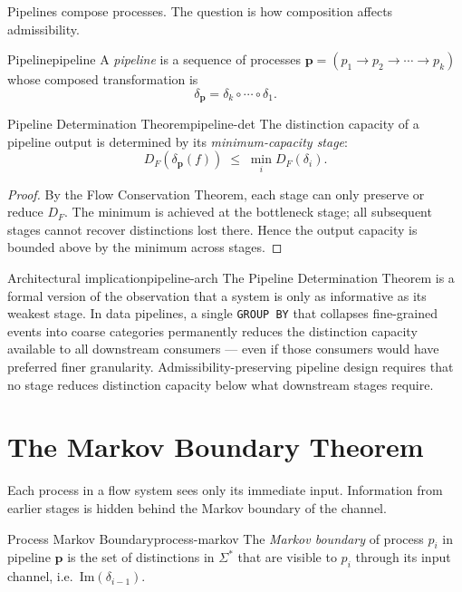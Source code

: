 \documentclass[12pt,twoside,openright]{book}
\newcommand{\csicon} {\marginpar{\tiny\color{DistBlue}\faCode}}
\begin{document}
Pipelines compose processes. The question is how
composition affects admissibility.

\begin{definition}{Pipeline}{pipeline}
  A \emph{pipeline} is a sequence of processes
  $\mathbf{p} = (p_1 \to p_2 \to \cdots \to p_k)$
  whose composed transformation is
  \[
    \delta_\mathbf{p} = \delta_k \circ \cdots \circ \delta_1.
  \]
\end{definition}

\begin{theorem}{Pipeline Determination Theorem}{pipeline-det}
  The distinction capacity of a pipeline output is
  determined by its \emph{minimum-capacity stage}:
  \[
    D_F(\delta_\mathbf{p}(f))
    \;\le\;
    \min_{i} D_F(\delta_i).
  \]
\end{theorem}

\begin{proof}
  By the Flow Conservation Theorem, each stage can only
  preserve or reduce $D_F$. The minimum is achieved at
  the bottleneck stage; all subsequent stages cannot
  recover distinctions lost there. Hence the output
  capacity is bounded above by the minimum across stages.
\end{proof}

\begin{remark}{Architectural implication}{pipeline-arch}
  \csicon
  The Pipeline Determination Theorem is a formal version
  of the observation that a system is only as informative
  as its weakest stage. In data pipelines, a single
  \texttt{GROUP BY} that collapses fine-grained events
  into coarse categories permanently reduces the
  distinction capacity available to all downstream
  consumers — even if those consumers would have
  preferred finer granularity. Admissibility-preserving
  pipeline design requires that no stage reduces
  distinction capacity below what downstream stages
  require.
\end{remark}

\section{The Markov Boundary Theorem}

Each process in a flow system sees only its immediate
input. Information from earlier stages is hidden behind
the Markov boundary of the channel.

\begin{definition}{Process Markov Boundary}{process-markov}
  The \emph{Markov boundary} of process $p_i$ in
  pipeline $\mathbf{p}$ is the set of distinctions
  in $\Sigma^*$ that are visible to $p_i$ through its
  input channel, i.e.\ $\mathrm{Im}(\delta_{i-1})$.
\end{definition}
\end{document}
